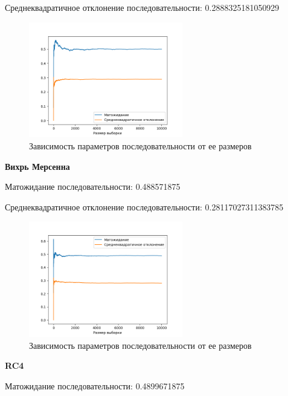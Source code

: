 \documentclass[spec, och, labwork]{shiza}
\begin{document}
\begin{enumerate}
  Среднеквадратичное отклонение последовательности: 0.2888325181050929
  \begin{figure}[H]
    \centering
    \includegraphics[width=0.6\textwidth]{pic/nfsr}
    \caption{Зависимость параметров последовательности от ее размеров}
    \label{fig:img1}
  \end{figure}
  \begin{center}
    \textbf{Вихрь Мерсенна}
  \end{center}
  Матожидание последовательности: 0.488571875

  Среднеквадратичное отклонение последовательности: 0.28117027311383785
  \begin{figure}[H]
    \centering
    \includegraphics[width=0.6\textwidth]{pic/mt}
    \caption{Зависимость параметров последовательности от ее размеров}
    \label{fig:img1}
  \end{figure}
  \begin{center}
    \textbf{RC4}
  \end{center}
  Матожидание последовательности: 0.4899671875


\end{enumerate}
\end{document}
